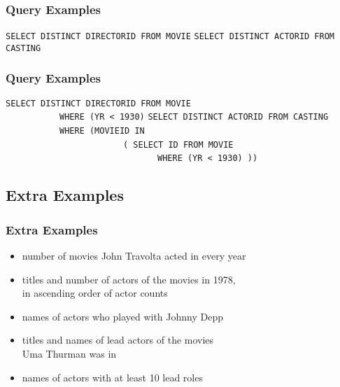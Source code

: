 \documentclass[dvipsnames]{beamer}
\theoremstyle{plain}
\begin{document}
\begin{frame}[fragile]
  \frametitle{Query Examples}

  \begin{example}
\lstinline!SELECT DISTINCT DIRECTORID FROM MOVIE!
\lstinline!SELECT DISTINCT ACTORID FROM CASTING!
  \end{example}
\end{frame}

\begin{frame}[fragile]
  \frametitle{Query Examples}

  \begin{example}
\lstinline!SELECT DISTINCT DIRECTORID FROM MOVIE!\\
~~~~~~~~~~~\lstinline!WHERE (YR < 1930)!
\lstinline!SELECT DISTINCT ACTORID FROM CASTING!\\
~~~~~~~~~~~\lstinline!WHERE (MOVIEID IN!\\
~~~~~~~~~~~~~~~~~~~~~~~~\lstinline!( SELECT ID FROM MOVIE!\\
~~~~~~~~~~~~~~~~~~~~~~~~~~~~~~~\lstinline!WHERE (YR < 1930) ))!
  \end{example}
\end{frame}

\subsection*{Extra Examples}

\begin{frame}
  \frametitle{Extra Examples}

  \begin{itemize}
    \item number of movies John Travolta acted in every year
    \item titles and number of actors of the movies in 1978,\\
      in ascending order of actor counts
    \item names of actors who played with Johnny Depp
    \item titles and names of lead actors of the movies\\
      Uma Thurman was in
    \item names of actors with at least 10 lead roles
  \end{itemize}
\end{frame}
\end{document}
